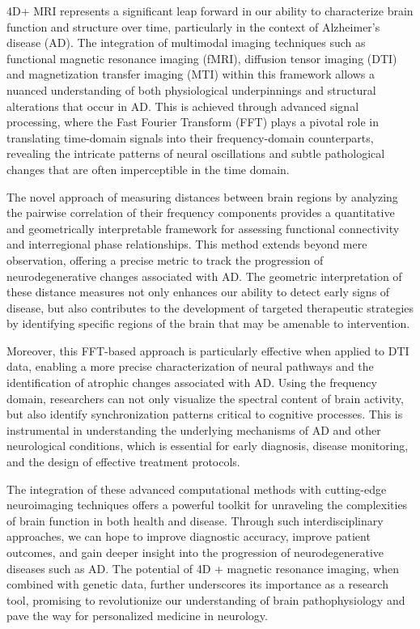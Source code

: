 \documentclass[twocolumn]{article}
\begin{document}
4D+ MRI represents a significant leap forward in our ability to characterize brain function and structure over time, particularly in the context of Alzheimer's disease (AD). The integration of multimodal imaging techniques such as functional magnetic resonance imaging (fMRI), diffusion tensor imaging (DTI) and magnetization transfer imaging (MTI) within this framework allows a nuanced understanding of both physiological underpinnings and structural alterations that occur in AD. This is achieved through advanced signal processing, where the Fast Fourier Transform (FFT) plays a pivotal role in translating time-domain signals into their frequency-domain counterparts, revealing the intricate patterns of neural oscillations and subtle pathological changes that are often imperceptible in the time domain.

The novel approach of measuring distances between brain regions by analyzing the pairwise correlation of their frequency components provides a quantitative and geometrically interpretable framework for assessing functional connectivity and interregional phase relationships. This method extends beyond mere observation, offering a precise metric to track the progression of neurodegenerative changes associated with AD. The geometric interpretation of these distance measures not only enhances our ability to detect early signs of disease, but also contributes to the development of targeted therapeutic strategies by identifying specific regions of the brain that may be amenable to intervention.

Moreover, this FFT-based approach is particularly effective when applied to DTI data, enabling a more precise characterization of neural pathways and the identification of atrophic changes associated with AD. Using the frequency domain, researchers can not only visualize the spectral content of brain activity, but also identify synchronization patterns critical to cognitive processes. This is instrumental in understanding the underlying mechanisms of AD and other neurological conditions, which is essential for early diagnosis, disease monitoring, and the design of effective treatment protocols.

The integration of these advanced computational methods with cutting-edge neuroimaging techniques offers a powerful toolkit for unraveling the complexities of brain function in both health and disease. Through such interdisciplinary approaches, we can hope to improve diagnostic accuracy, improve patient outcomes, and gain deeper insight into the progression of neurodegenerative diseases such as AD. The potential of 4D + magnetic resonance imaging, when combined with genetic data, further underscores its importance as a research tool, promising to revolutionize our understanding of brain pathophysiology and pave the way for personalized medicine in neurology.
\end{document}
